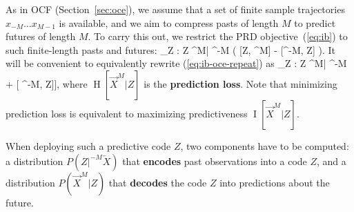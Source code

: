 \documentclass[entropy,article,submit,moreauthors,pdftex,10pt,a4paper]{Definitions/mdpi}
\newif \ifcomment
\newcommand\rljf[1]{\ifcomment{{\color{blue}(#1)}}\else{}\fi}
\newcommand{\past}{\overleftarrow{X}}
\newcommand{\key}{\textbf}
\newcommand{\finitefuture}{\overrightarrow{X}^{M}}
\newcommand{\finitepast}{^{-M}\overleftarrow{X}}%
\let\oldequation\equation
\let\oldendequation\endequation
\renewenvironment{equation}
  {\linenomathNonumbers\oldequation}
  {\oldendequation\endlinenomath}
\begin{document}
As in OCF (Section~\ref{sec:oce}), we assume that a set of finite sample trajectories $x_{-M} \dots x_{M-1}$ is available, and we aim to compress pasts of length $M$ to predict futures of length $M$. To carry this out, we restrict the PRD objective~(\ref{eq:ib}) to such finite-length pasts and futures: %
\begin{equation}\label{eq:ib-oce-repeat}
	\max_{Z : Z \bot \finitefuture | \finitepast} \left( [Z, \finitefuture] - \lambda \cdot {}[\finitepast, Z] \right).
\end{equation}
It will be convenient to equivalently rewrite (\ref{eq:ib-oce-repeat}) as
\begin{equation}\label{eq:prd-loss}
	\min_{Z : Z \bot \finitefuture | \finitepast}	\left[\operatorname{H}[\finitefuture | Z] + \lambda \cdot{}[ \finitepast, Z]\right],
\end{equation}
where $\operatorname{H}[\finitefuture | Z]$ is the \key{prediction loss}. Note that minimizing prediction loss is equivalent to maximizing predictiveness $\operatorname{I}[\finitefuture | Z]$. %


When deploying such a predictive code $Z$, two components have to be computed: a distribution $P(Z|\finitepast)$ that \key{encodes} past observations into a code $Z$, and a distribution $P(\finitefuture|Z)$ that \key{decodes} the code $Z$ into predictions about the future.
\end{document}
